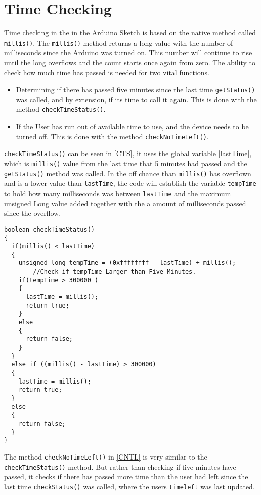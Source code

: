 \section{Time Checking}
Time checking in the in the Arduino Sketch is based on the native method called \verb|millis()|.
The \verb|millis()| method returns a long value with the number of milliseconds since the Arduino was turned on.
This number will continue to rise until the long overflows and the count starts once again from zero.\newline
The ability to check how much time has passed is needed for two vital functions.
\begin{itemize}
	\item Determining if there has passed five minutes since the last time \verb|getStatus()| was called, and by extension, if its time to call it again. This is done with the method \verb|checkTimeStatus()|.
	\item If the User has run out of available time to use, and the device needs to be turned off. This is done with the method \verb|checkNoTimeLeft()|.
\end{itemize}


\verb|checkTimeStatus()| can be seen in \autoref{CTS}, it uses the global variable |lastTime|, which is \verb|millis()| value from the last time that 5 minutes had passed and the \verb|getStatus()| method was called. In the off chance than \verb|millis()| has overflown and is a lower value than \verb|lastTime|, the code will establish the variable \verb|tempTime| to hold how many milliseconds was between \verb|lastTime| and the maximum unsigned Long value added together with the a amount of milliseconds passed since the overflow.

\begin{lstlisting}[frame=single, label=CTS, caption=Checking if five minutes has passed since the last getStatus() call.]
boolean checkTimeStatus()
{
  if(millis() < lastTime)
  {
    unsigned long tempTime = (0xffffffff - lastTime) + millis();
		//Check if tempTime Larger than Five Minutes.
    if(tempTime > 300000 )
    {      
      lastTime = millis();
      return true;
    }
    else
    {
      return false;
    }
  }
  else if ((millis() - lastTime) > 300000)
  {
    lastTime = millis();
    return true;
  }
  else
  {
    return false;  
  }  
}
\end{lstlisting}

The method \verb|checkNoTimeLeft()| in \autoref{CNTL} is very similar to the \verb|checkTimeStatus()| method. But rather than checking if five minutes have passed, it checks if there has passed more time than the user had left since the last time \verb|checkStatus()| was called, where the users \verb|timeleft| was last updated.

